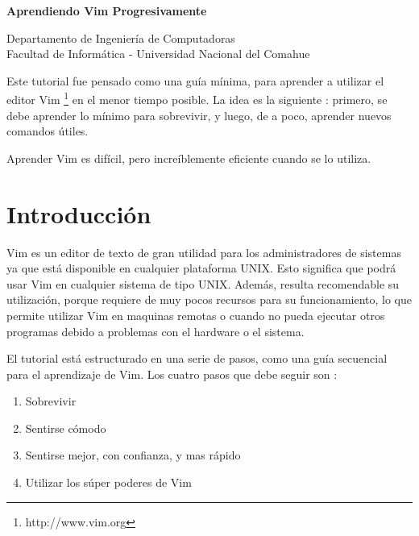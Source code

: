 \documentclass[12pt]{article}
\def\maketitle{

 \makeatletter
 {\color{bl} \centering \huge \sc \textbf{
 Aprendiendo Vim Progresivamente \\ 
 \vspace*{8pt} }\par}
 \makeatother


 \makeatletter
 {\centering \small 
 	Departamento de Ingeniería de Computadoras \\
 	Facultad de Informática - Universidad Nacional del Comahue \\
 	\vspace{20pt} }
 \makeatother

}
\begin{document}
\thispagestyle{empty}
\maketitle
\setlength{\parindent}{0pt}


Este tutorial fue pensado como una guía mínima, para aprender a utilizar el editor Vim 
\footnote{http://www.vim.org}
en el menor tiempo posible. La idea es la siguiente : primero, se debe aprender lo mínimo para sobrevivir,
y luego, de a poco, aprender nuevos comandos útiles.

Aprender Vim es difícil, pero increíblemente eficiente cuando se lo utiliza.

\section{Introducción}

Vim es un editor de texto de gran utilidad para los administradores de sistemas ya
que está disponible en cualquier plataforma UNIX. Esto significa
que podrá usar Vim en cualquier sistema de tipo UNIX. Además,
resulta recomendable su utilización, porque requiere de muy pocos
recursos para su funcionamiento, lo que permite utilizar Vim
en maquinas remotas o cuando no pueda ejecutar otros programas
debido a problemas con el hardware o el sistema.


El tutorial está estructurado en una serie de pasos, como una guía
secuencial para el aprendizaje de Vim. Los cuatro pasos que debe seguir son :

\begin{enumerate}
	\item Sobrevivir
	\item Sentirse cómodo
	\item Sentirse mejor, con confianza, y mas rápido
	\item Utilizar los súper poderes de Vim
\end{enumerate}
\end{document}
